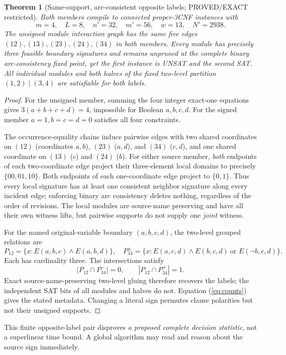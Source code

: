 \documentclass[11pt]{article}
\newtheorem{theorem}{Theorem}
\begin{document}
\begin{theorem}[Same-support, arc-consistent opposite labels; PROVED/EXACT restricted]
Both members compile to connected proper-3CNF instances with
\[
m=4,\quad L=8,\quad n'=32,\quad m'=56,\quad w=13,\quad N'=2938.
\]
The unsigned module interaction graph has the same five edges
\((12),(13),(23),(24),(34)\) in both members. Every module has precisely three feasible boundary signatures and remains unpruned at the complete binary arc-consistency fixed point, yet the first instance is UNSAT and the second SAT. All individual modules and both halves of the fixed two-level partition \((1,2)\mid(3,4)\) are satisfiable for both labels.
\end{theorem}
\begin{proof}
For the unsigned member, summing the four integer exact-one equations gives
\(3(a+b+c+d)=4\), impossible for Boolean \(a,b,c,d\). For the signed member \(a=1,b=c=d=0\) satisfies all four constraints.

The occurrence-equality chains induce pairwise edges with two shared coordinates on \((12)\) (coordinates \(a,b\)), \((23)\) (\(a,d\)), and \((34)\) (\(c,d\)), and one shared coordinate on \((13)\) (\(c\)) and \((24)\) (\(b\)). For either source member, \emph{both} endpoints of each two-coordinate edge project their three-element local domains to precisely \(\{00,01,10\}\). Both endpoints of each one-coordinate edge project to \(\{0,1\}\). Thus every local signature has at least one consistent neighbor signature along every incident edge; enforcing binary arc consistency deletes nothing, regardless of the order of revisions. The local modules are source-name preserving and have all their own witness lifts, but pairwise supports do not supply one \emph{joint} witness.

For the named original-variable boundary \((a,b,c,d)\), the two-level grouped relations are
\[
P_{12}=\{x:E(a,b,c)\land E(a,b,d)\},\quad
P_{34}^{\pm}=\{x:E(a,c,d)\land E(b,c,d)\ \text{or }E(\neg b,c,d)\}.
\]
Each has cardinality three. The intersections satisfy
\[
|P_{12}\cap P_{34}^{-}|=0,\qquad
|P_{12}\cap P_{34}^{+}|=1.
\]
Exact source-name-preserving two-level gluing therefore recovers the labels; the independent SAT bits of all modules and halves do not. Equation (\ref{eq:counts}) gives the stated metadata. Changing a literal sign permutes clause polarities but not their unsigned supports.
\end{proof}

This finite opposite-label pair disproves \emph{a proposed complete decision statistic}, not a superlinear time bound. A global algorithm may read and reason about the source sign immediately.
\end{document}
